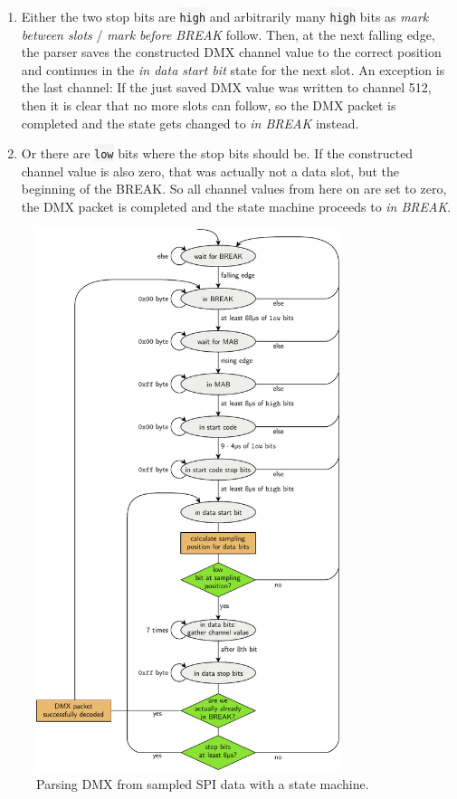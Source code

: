 \begin{enumerate}
\def\labelenumi{\alph{enumi})}
\tightlist
\item
  Either the two stop bits are \colorbox{WhiteSmoke}{\lstinline!high!} and arbitrarily many
  \colorbox{WhiteSmoke}{\lstinline!high!} bits as \emph{mark between slots} / \emph{mark before
  BREAK} follow. Then, at the next falling edge, the parser saves the
  constructed DMX channel value to the correct position and continues in
  the \emph{in data start bit} state for the next slot. An exception is
  the last channel: If the just saved DMX value was written to channel
  512, then it is clear that no more slots can follow, so the DMX packet
  is completed and the state gets changed to \emph{in BREAK} instead.
\item
  Or there are \colorbox{WhiteSmoke}{\lstinline!low!} bits where the stop bits should be. If
  the constructed channel value is also zero, that was actually not a
  data slot, but the beginning of the BREAK. So all channel values from
  here on are set to zero, the DMX packet is completed and the state
  machine proceeds to \emph{in BREAK}.
\end{enumerate}

\begin{figure}
\centering
\includegraphics[width=0.79000\textwidth]{Bilder/spi-dmx-state-machine.pdf}
\caption[Parsing DMX from sampled SPI data with a state
machine]{Parsing DMX from sampled SPI data with a state
machine.}\label{fig:spi-dmx-state-machine}
\end{figure}

